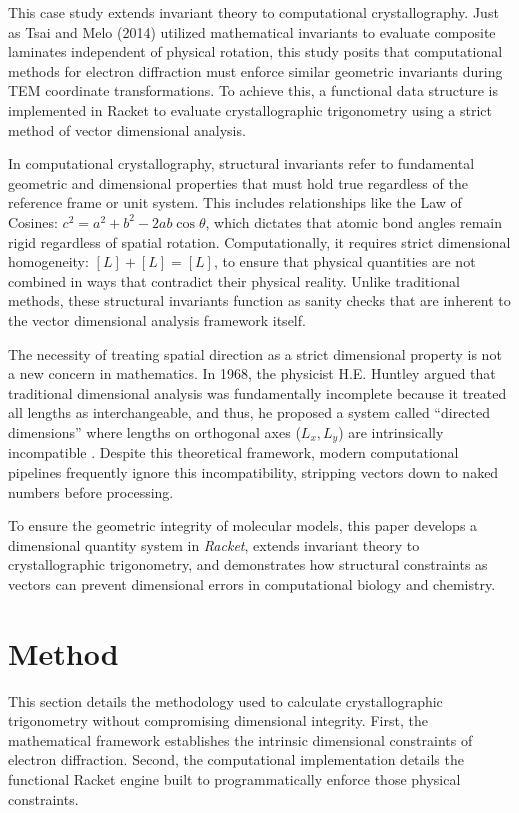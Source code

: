 \documentclass[man]{apa7}
\begin{document}
	This case study extends invariant theory to computational crystallography. Just as Tsai and Melo (2014) utilized mathematical invariants to evaluate composite laminates independent of physical rotation, this study posits that computational methods for electron diffraction must enforce similar geometric invariants during TEM coordinate transformations. To achieve this, a functional data structure is implemented in Racket to evaluate crystallographic trigonometry using a strict method of vector dimensional analysis.
	
	In computational crystallography, structural invariants refer to fundamental geometric and dimensional properties that must hold true regardless of the reference frame or unit system. This includes relationships like the Law of Cosines: \(c^2 = a^2 + b^2 - 2ab \cos\theta\), which dictates that atomic bond angles remain rigid regardless of spatial rotation. Computationally, it requires strict dimensional homogeneity: $[L] + [L] = [L]$, to ensure that physical quantities are not combined in ways that contradict their physical reality. Unlike traditional methods, these structural invariants function as sanity checks that are inherent to the vector dimensional analysis framework itself.
	
	The necessity of treating spatial direction as a strict dimensional property is not a new concern in mathematics. In 1968, the physicist H.E. Huntley argued that traditional dimensional analysis was fundamentally incomplete because it treated all lengths as interchangeable, and thus, he proposed a system called ``directed dimensions'' where lengths on orthogonal axes ($L_x, L_y$) are intrinsically incompatible \parencite{Huntley1968}. Despite this theoretical framework, modern computational pipelines frequently ignore this incompatibility, stripping vectors down to naked numbers before processing. 
	
	To ensure the geometric integrity of molecular models, this paper develops a dimensional quantity system in \textit{Racket}, extends invariant theory to crystallographic trigonometry, and demonstrates how structural constraints as vectors can prevent dimensional errors in computational biology and chemistry.
	
	\section{Method}
	This section details the methodology used to calculate crystallographic trigonometry without compromising dimensional integrity. First, the mathematical framework establishes the intrinsic dimensional constraints of electron diffraction. Second, the computational implementation details the functional Racket engine built to programmatically enforce those physical constraints.
\end{document}
